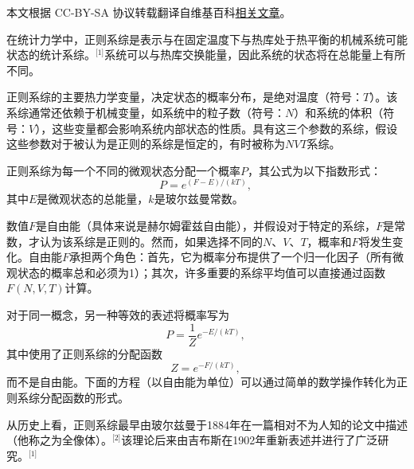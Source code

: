 
本文根据 CC-BY-SA 协议转载翻译自维基百科\href{https://en.wikipedia.org/wiki/Canonical_ensemble}{相关文章}。

在统计力学中，正则系综是表示与在固定温度下与热库处于热平衡的机械系统可能状态的统计系综。\(^\text{[1]}\)系统可以与热库交换能量，因此系统的状态将在总能量上有所不同。

正则系综的主要热力学变量，决定状态的概率分布，是绝对温度（符号：\(T\)）。该系综通常还依赖于机械变量，如系统中的粒子数（符号：\(N\)）和系统的体积（符号：\(V\)），这些变量都会影响系统内部状态的性质。具有这三个参数的系综，假设这些参数对于被认为是正则的系综是恒定的，有时被称为\(NVT\)系综。

正则系综为每一个不同的微观状态分配一个概率\(P\)，其公式为以下指数形式：
\[
P = e^{(F - E) / (kT)},~
\]
其中\(E\)是微观状态的总能量，\(k\)是玻尔兹曼常数。

数值\(F\)是自由能（具体来说是赫尔姆霍兹自由能），并假设对于特定的系综，\(F \)是常数，才认为该系综是正则的。然而，如果选择不同的\(N\)、\(V\)、\( T\)，概率和\(F\)将发生变化。自由能\(F\)承担两个角色：首先，它为概率分布提供了一个归一化因子（所有微观状态的概率总和必须为1）；其次，许多重要的系综平均值可以直接通过函数\(F(N, V, T)\)计算。

对于同一概念，另一种等效的表述将概率写为
\[
P = \frac{1}{Z} e^{-E / (kT)},~
\]
其中使用了正则系综的分配函数
\[
Z = e^{-F / (kT)},~
\]
而不是自由能。下面的方程（以自由能为单位）可以通过简单的数学操作转化为正则系综分配函数的形式。

从历史上看，正则系综最早由玻尔兹曼于1884年在一篇相对不为人知的论文中描述（他称之为全像体）。\(^\text{[2]}\)该理论后来由吉布斯在1902年重新表述并进行了广泛研究。\(^\text{[1]}\)